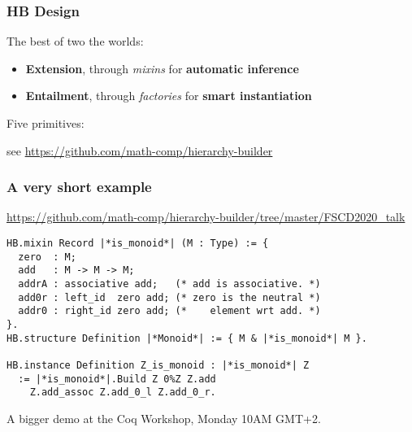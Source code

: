 \documentclass[11pt]{beamer}
\let\L=\lstinline
\begin{document}
\begin{frame}
  \frametitle{HB Design}

  The best of two the worlds:
  \begin{itemize}
  \item \textbf{Extension}, through \emph{mixins} for \textbf{automatic inference}

  \item \textbf{Entailment}, through \emph{factories} for
    \textbf{smart instantiation}

  \end{itemize}
  \vspace{2em}
  \pause
  \vfill

  Five primitives:
  \vfill

  \pause
  \begin{center}
    see \url{https://github.com/math-comp/hierarchy-builder}
  \end{center}

\end{frame}

\begin{frame}[fragile]
  \frametitle{A very short example}
{\scriptsize\url{https://github.com/math-comp/hierarchy-builder/tree/master/FSCD2020_talk}}

\begin{lstlisting}
HB.mixin Record |*is_monoid*| (M : Type) := {
  zero  : M;
  add   : M -> M -> M;
  addrA : associative add;   (* add is associative. *)
  add0r : left_id  zero add; (* zero is the neutral *)
  addr0 : right_id zero add; (*    element wrt add. *)
}.
HB.structure Definition |*Monoid*| := { M & |*is_monoid*| M }.

HB.instance Definition Z_is_monoid : |*is_monoid*| Z
  := |*is_monoid*|.Build Z 0%Z Z.add
    Z.add_assoc Z.add_0_l Z.add_0_r.
\end{lstlisting}
  \vfill

  A bigger demo at the Coq Workshop, Monday 10AM GMT+2.
\end{frame}
\end{document}
